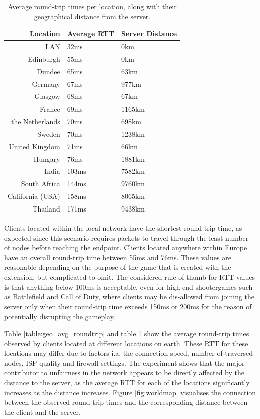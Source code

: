\documentclass[bsc, 12pt, twoside, singlespacing, parskip, abbrevs, notimes, normalheadings, logo, deptreport]{styles/infthesis}
\begin{document}
\begin{table}[H]
\centering
  \begin{tabular}{ r | l | l }
Location		& Average RTT	& Server Distance \\ \hline\hline
LAN				& 32ms			&0km\\
Edinburgh		& 55ms			&0km\\
Dundee			& 65ms			&63km\\
Germany			& 67ms			&977km\\
Glasgow			& 68ms			&67km\\
France			& 69ms			&1165km\\
the Netherlands	& 70ms			&698km\\
Sweden			& 70ms			&1238km\\
United Kingdom	& 71ms			&66km\\
Hungary			& 76ms			&1881km\\
India			& 103ms			&7582km\\
South Africa	& 144ms			&9760km\\
California (USA)& 158ms			&8065km\\
Thailand		& 171ms			&9438km\\
  \end{tabular}
  \caption{Average round-trip times per location, along with their geographical distance from the server.}
  \label{table:geo_avg_location}
\end{table}

Clients located within the local network have the shortest round-trip time, as expected since this scenario requires packets to travel through the least number of nodes before reaching the endpoint. Clients located anywhere within Europe have an overall round-trip time between 55ms and 76ms. These values are reasonable depending on the purpose of the game that is created with the extension, but complicated to omit. The considered rule of thumb for RTT values is that anything below 100ms is acceptable, even for high-end shootergames such as Battlefield and Call of Duty, where clients may be dis-allowed from joining the server only when their round-trip time exceeds 150ms or 200ms for the reason of potentially disrupting the gameplay.

Table \ref{table:geo_avg_roundtrip} and table \ref{table:geo_avg_location} show the average round-trip times observed by clients located at different locations on earth. These RTT for these locations may differ due to factors i.a. the connection speed, number of traversed nodes, ISP quality and firewall settings. The experiment shows that the major contributor to unfairness in the network appears to be directly affected by the distance to the server, as the average RTT for each of the locations significantly increases as the distance increases. Figure \ref{fig:worldmap} visualises the connection between the observed round-trip times and the corresponding distance between the client and the server. 
\end{document}

